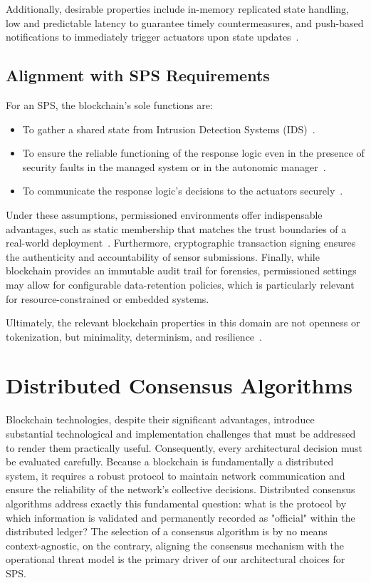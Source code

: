 Additionally, desirable properties include in-memory replicated state handling, low and predictable latency to guarantee timely countermeasures, and push-based notifications to immediately trigger actuators upon state updates~\cite{albero2026blockchain}.

\subsection{Alignment with SPS Requirements}
For an SPS, the blockchain's sole functions are:
\begin{itemize}
    \item To gather a shared state from Intrusion Detection Systems (IDS)~\cite{albero2026blockchain}.
    \item To ensure the reliable functioning of the response logic even in the presence of security faults in the managed system or in the autonomic manager~\cite{albero2026blockchain}.
    \item To communicate the response logic's decisions to the actuators securely~\cite{albero2026blockchain}.
\end{itemize}

Under these assumptions, permissioned environments offer indispensable advantages, such as static membership that matches the trust boundaries of a real-world deployment~\cite{albero2026blockchain}. Furthermore, cryptographic transaction signing ensures the authenticity and accountability of sensor submissions. Finally, while blockchain provides an immutable audit trail for forensics, permissioned settings may allow for configurable data-retention policies, which is particularly relevant for resource-constrained or embedded systems.

Ultimately, the relevant blockchain properties in this domain are not openness or tokenization, but minimality, determinism, and resilience~\cite{albero2026blockchain}.
\section{Distributed Consensus Algorithms}
\label{sec:tech_consensus}

Blockchain technologies, despite their significant advantages, introduce substantial technological and implementation challenges that must be addressed to render them practically useful. Consequently, every architectural decision must be evaluated carefully. Because a blockchain is fundamentally a distributed system, it requires a robust protocol to maintain network communication and ensure the reliability of the network's collective decisions. Distributed consensus algorithms address exactly this fundamental question: what is the protocol by which information is validated and permanently recorded as "official" within the distributed ledger? The selection of a consensus algorithm is by no means context-agnostic, on the contrary, aligning the consensus mechanism with the operational threat model is the primary driver of our architectural choices for SPS.

